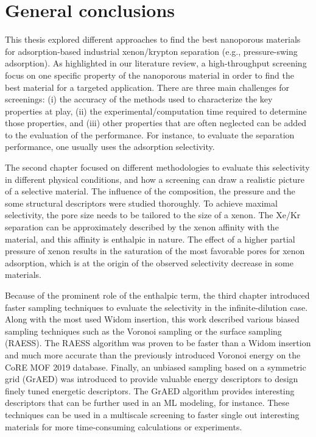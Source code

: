 
\chapter*{General conclusions}

This thesis explored different approaches to find the best nanoporous materials for adsorption-based industrial xenon/krypton separation (e.g., pressure-swing adsorption). As highlighted in our literature review,\autocite{Ren_2022} a high-throughput screening focus on one specific property of the nanoporous material in order to find the best material for a targeted application. There are three main challenges for screenings: (i) the accuracy of the methods used to characterize the key properties at play, (ii) the experimental/computation time required to determine those properties, and (iii) other properties that are often neglected can be added to the evaluation of the performance. For instance, to evaluate the separation performance, one usually uses the adsorption selectivity. 

The second chapter focused on different methodologies to evaluate this selectivity in different physical conditions, and how a screening can draw a realistic picture of a selective material.\autocite{Ren_2021} The influence of the composition, the pressure and the some structural descriptors were studied thoroughly. To achieve maximal selectivity, the pore size needs to be tailored to the size of a xenon. The Xe/Kr separation can be approximately described by the xenon affinity with the material, and this affinity is enthalpic in nature. The effect of a higher partial pressure of xenon results in the saturation of the most favorable pores for xenon adsorption, which is at the origin of the observed selectivity decrease in some materials.
 
Because of the prominent role of the enthalpic term, the third chapter introduced faster sampling techniques to evaluate the selectivity in the infinite-dilution case. Along with the most used Widom insertion, this work described various biased sampling techniques such as the Voronoi sampling or the surface sampling (RAESS). The RAESS algorithm\autocite{Ren_2023} was proven to be faster than a Widom insertion and much more accurate than the previously introduced Voronoi energy\autocite{Simon_2015} on the CoRE MOF 2019 database. Finally, an unbiased sampling based on a symmetric grid (GrAED) was introduced to provide valuable energy descriptors to design finely tuned energetic descriptors. The GrAED algorithm provides interesting descriptors that can be further used in an ML modeling, for instance.
These techniques can be used in a multiscale screening to faster single out interesting materials for more time-consuming calculations or experiments. 


